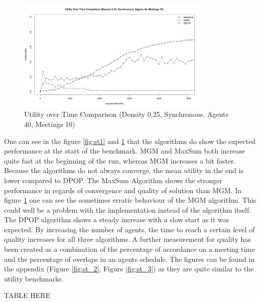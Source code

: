 \begin{figure}[H]
\centering
\includegraphics[width=350px]{graphics/experiments/static/st_3}
\caption{Utility over Time Comparison (Density 0.25, Synchronous, Agents 40, Meetings 10)}
\label{fig:st2}

\end{figure}

One can see in the figure \ref{fig:st1} and \ref{fig:st2} that the algorithms do show the expected performance at the start of the benchmark. MGM and MaxSum both increase quite fast at the beginning of the run, whereas MGM increases a bit faster. Because the algorithms do not always converge, the mean utility in the end is lower compared to DPOP. The MaxSum Algorithm shows the stronger performance in regards of convergence and quality of solution than MGM. In figure \ref{fig:st2} one can see the sometimes erratic behaviour of the MGM algorithm. This could well be a problem with the implementation instead of the algorithm itself. The DPOP algorithm shows a steady increase with a slow start as it was expected. By increasing the number of agents, the time to reach a certain level of quality increases for all three algorithms. A further measurement for quality has been created as a combination of the percentage of accordance on a meeting time and the percentage of overlaps in an agents schedule. The figures can be found in the appendix (Figure \ref{fig:st_2}, Figure \ref{fig:st_3}) as they are quite similar to the utility benchmarks.

TABLE HERE


